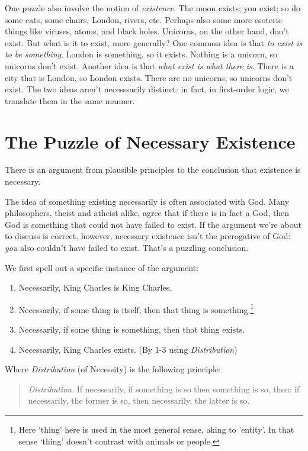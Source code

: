 \documentclass[../../../include/open-logic-chapter]{subfiles}
\begin{document}
One puzzle also involve the notion of \emph{existence}. The moon exists; you exist;  so do some cats, some chairs, London, rivers, etc. Perhaps also some 
more esoteric things like viruses, atoms, and black holes. Unicorns, on 
the other hand, don't exist. But what is it to exist, more generally? 
One common idea is that \emph{to exist is to be 
something}. London is something, so it exists. Nothing is a unicorn, 
so unicorns don't exist. Another idea is that \emph{what exist is 
what there is}. There is a city that is London, so London exists. 
There are no unicorns, so unicorns don't exist. The two ideas aren't
necesssarily distinct: in fact, in first-order logic, we translate them 
in the same manner. 

\section{The Puzzle of Necessary Existence}

There is an argument from plausible principles to the conclusion that existence is necessary. 

The idea of something existing necessarily is often associated with
God. Many philosophers, theist and atheist alike, agree that if there
is in fact a God, then God is something that could not have failed to
exist. If the argument we're about to discuss is correct, however,
necessary existence isn't the prerogative of God: \emph{you} also
couldn't have failed to exist. That's a puzzling conclusion.

We first spell out a specific instance of the argument:

\begin{enumerate}
\item Necessarily, King Charles is King Charles.
\item Necessarily, if some thing is itself, then that thing is
something.\footnote{Here `thing' here is used in the most general
sense, aking to 'entity'. In that sense `thing' doesn't contrast with
animals or people.}
\item Necessarily, if some thing is something, then that thing exists. 
\item Necessarily, King Charles exists. (By 1-3 using \emph{Distribution})
\end{enumerate}

Where \emph{Distribution} (of Necessity) is the following principle:

\begin{quote}
\emph{Distribution}. If necessarily, if something is so then something is so, then: if necessarily, the former is so, then necessarily, the latter is so.
\end{quote}
\end{document}
